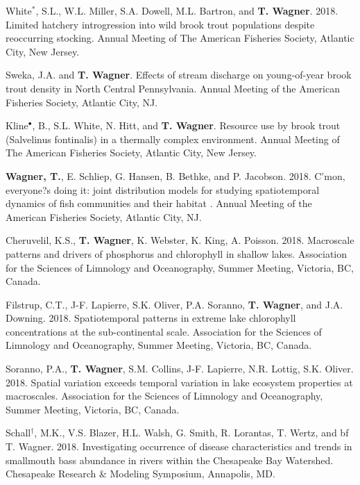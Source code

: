 \documentclass[10pt]{article}
\begin{document}
\begin{flushleft}
\begin{etaremune}
\item White$^*$, S.L., W.L. Miller, S.A. Dowell, M.L. Bartron, and {\bf T. Wagner}. 2018. Limited hatchery introgression into wild brook trout populations despite reoccurring stocking. Annual Meeting of The American Fisheries Society, Atlantic City, New Jersey.

\item Sweka, J.A. and {\bf T. Wagner}. Effects of stream discharge on young-of-year brook trout density in North Central Pennsylvania. Annual Meeting of the American Fisheries Society, Atlantic City, NJ.

\item Kline$^\bullet$, B., S.L. White, N. Hitt, and {\bf T. Wagner}. Resource use by brook trout (Salvelinus fontinalis) in a thermally complex environment. Annual Meeting of The American Fisheries Society, Atlantic City, New Jersey.

\item {\bf Wagner, T.}, E. Schliep, G. Hansen, B. Bethke, and P. Jacobson. 2018. C'mon, everyone?s doing it: joint distribution models for studying spatiotemporal dynamics of fish communities and their habitat . Annual Meeting of the American Fisheries Society, Atlantic City, NJ.

\item Cheruvelil, K.S., {\bf T. Wagner}, K. Webster, K. King, A. Poisson. 2018. Macroscale patterns and drivers of phosphorus and chlorophyll in shallow lakes. Association for the Sciences of Limnology and Oceanography, Summer Meeting, Victoria, BC, Canada.

\item Filstrup, C.T., J-F. Lapierre, S.K. Oliver, P.A. Soranno, {\bf T. Wagner}, and J.A. Downing. 2018. Spatiotemporal patterns in extreme lake chlorophyll concentrations at the sub-continental scale. Association for the Sciences of Limnology and Oceanography, Summer Meeting, Victoria, BC, Canada.

\item Soranno, P.A., {\bf T. Wagner}, S.M. Collins, J-F. Lapierre, N.R. Lottig, S.K. Oliver. 2018. Spatial variation exceeds temporal variation in lake ecosystem properties at macroscales. Association for the Sciences of Limnology and Oceanography, Summer Meeting, Victoria, BC, Canada.

\item Schall$^\dagger$, M.K., V.S. Blazer, H.L. Walsh, G. Smith, R. Lorantas, T. Wertz, and {bf T. Wagner}. 2018. Investigating occurrence of disease characteristics and trends in smallmouth bass abundance in rivers within the Chesapeake Bay Watershed. Chesapeake Research \& Modeling Symposium, Annapolis, MD.


\end{etaremune}
\end{flushleft}
\end{document}
